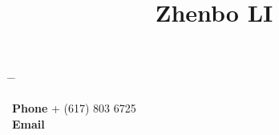 

\title{Zhenbo LI} %

\vspace{-0.5cm}
\parbox[c][3em][t]{0.9\textwidth}{ %
	\begin{tabbing} %
		\hspace{3cm} \= \hspace{4cm} \= \kill %
		
{\bf Phone} \> + (617) 803 6725 \\ %
{\bf Email} \> \\
		
	\end{tabbing}
}

\vspace{3mm}
